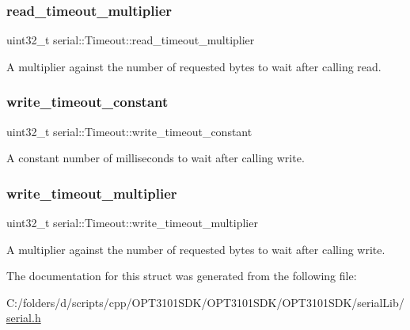\subsubsection{\texorpdfstring{read\+\_\+timeout\+\_\+multiplier}{read\_timeout\_multiplier}}
{\footnotesize\ttfamily uint32\+\_\+t serial\+::\+Timeout\+::read\+\_\+timeout\+\_\+multiplier}

A multiplier against the number of requested bytes to wait after calling read. \mbox{\label{structserial_1_1_timeout_accf01b97f83564f4ce3d6e5f63e21006}} 
\subsubsection{\texorpdfstring{write\+\_\+timeout\+\_\+constant}{write\_timeout\_constant}}
{\footnotesize\ttfamily uint32\+\_\+t serial\+::\+Timeout\+::write\+\_\+timeout\+\_\+constant}

A constant number of milliseconds to wait after calling write. \mbox{\label{structserial_1_1_timeout_a31ddae32907cff9c3d27fa763981317d}} 
\subsubsection{\texorpdfstring{write\+\_\+timeout\+\_\+multiplier}{write\_timeout\_multiplier}}
{\footnotesize\ttfamily uint32\+\_\+t serial\+::\+Timeout\+::write\+\_\+timeout\+\_\+multiplier}

A multiplier against the number of requested bytes to wait after calling write. 

The documentation for this struct was generated from the following file\+:\begin{DoxyCompactItemize}
\item 
C\+:/folders/d/scripts/cpp/\+O\+P\+T3101\+S\+D\+K/\+O\+P\+T3101\+S\+D\+K/\+O\+P\+T3101\+S\+D\+K/serial\+Lib/\mbox{\hyperlink{serial_8h}{serial.\+h}}\end{DoxyCompactItemize}

